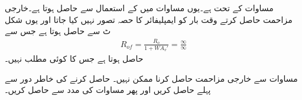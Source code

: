 مساوات  کے تحت  ہے۔یوں مساوات  میں  کے استعمال سے  حاصل ہوتا ہے۔خارجی مزاحمت  حاصل کرتے وقت بار  کو ایمپلیفائر کا حصہ تصور نہیں کیا جاتا اور یوں شکل  ٹ سے  حاصل ہوتا ہے جس سے
\begin{align*} \label{مساوات_واپسی_تابع_مخارج_خارجی_مزاحمت_مسئلہ}
R_{of}=\frac{R_o}{1+W A_v'} =\frac{\infty}{\infty}
\end{align*}
حاصل ہوتا ہے جس کا کوئی مطلب نہیں۔

مساوات  سے خارجی مزاحمت حاصل کرنا ممکن نہیں۔ حاصل کرنے کی خاطر  دور سے پہلے  حاصل کریں اور پھر مساوات  کی مدد سے   حاصل کریں۔

